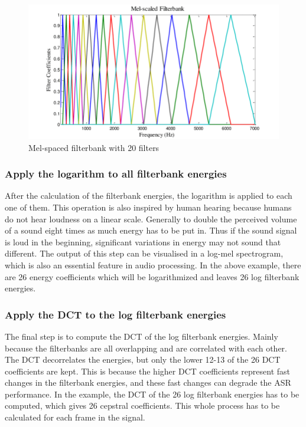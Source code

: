 \begin{figure}[htbp]
	\centering
	\includegraphics[scale=0.4]{baa-documentation/img/Mel-filter-banks-basis-functions-using-20-Mel-filters-in-the-filter-bank.png}
	\caption[Mel-spaced filterbank with 20 filters]{Mel-spaced filterbank with 20 filters \footnotemark}
	\label{fig:MFCC-Mel-Filterbank}
\end{figure}

\subsubsection{Apply the logarithm to all filterbank energies}
After the calculation of the filterbank energies, the logarithm is applied to each one of them. This operation is also inspired by human hearing because humans do not hear loudness on a linear scale. Generally to double the perceived volume of a sound eight times as much energy has to be put in. Thus if the sound signal is loud in the beginning, significant variations in energy may not sound that different. The output of this step can be visualised in a log-mel spectrogram, which is also an essential feature in audio processing.
\newline
\newline
In the above example, there are 26 energy coefficients which will be logarithmized and leaves 26 log filterbank energies.

\subsubsection{Apply the \gls{DCT} to the log filterbank energies}
The final step is to compute the \gls{DCT} of the log filterbank energies. Mainly because the filterbanks are all overlapping and are correlated with each other. The \gls{DCT} decorrelates the energies, but only the lower 12-13 of the 26 \gls{DCT} coefficients are kept. This is because the higher \gls{DCT} coefficients represent fast changes in the filterbank energies, and these fast changes can degrade the \gls{ASR} performance.
\newline
\newline
In the example, the \gls{DCT} of the 26 log filterbank energies has to be computed, which gives 26 cepstral coefficients. This whole process has to be calculated for each frame in the signal.

